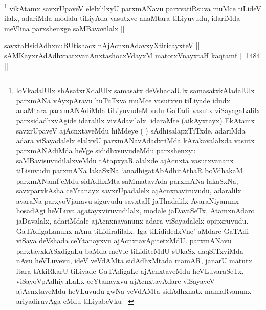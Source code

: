 \begin{artha}
\footnote{loVkadalUlx shAsatxrXdalUlx samasatx deVshadalUlx samasatxkAladalUlx parxmANa vAyxpAravu huTuTxva muMce vasutxvu tiLiyade idudx anaMtara parxmANAdiMda tiLiyuvudeMbudu GaTadi vasutx viSayagaLalilx parxsidadhxvAgide idaralilx vivAdavilalx. idaraMte (aikAyxtayx) EkAtamx savxrUpaveV ajAcnxtaveMdu hiMdeye ( ) sAdhisalapxTiTxde, adariMda adara viSayadalelx elalxvU parxmANavAdadxriMda kArakavalalxda vasutx parxmANAdiMda heVge sididhxsuvudeMdu parxshenxyu saMBavisuvudilalxveMdu tAtapxyaR alalxde ajAcnxta vasutxvananx tiLisuvudu parxmANa lakaSxNa `anadhigatAbAdhitAthaR boVdhakaM parxmANamf'eMdu sidAdhxMta saMmatavAda parxmANa lakaSxNa, savxparxkAsha ceYtanayx savxrUpadalelx ajAcnxnaviruvudu, adaralilx avaraNa parxyoVjanavu siguvudu savxtaH jaThadalilx AvaraNiyanunx hosadAgi heVLuva agatayxviruvudilalx, modale jaDavaSeTx, AtamxnAdaro jaDavalalx, adariMdale ajAcnxnavanunx adara viSayadalelx opipxruvudu. GaTAdigaLanunx nAnu tiLidiralilalx. Iga tiLididedxVne' aMdare GaTAdi viSaya deVshada ceYtanayxvu ajAcnxtavAgitetxMdU. parxmANavu parxtayxkASxdigaLu baMda meVle tiLiditeMdU sUkaSx daqSiTxyiMda nAvu heVLuvevu, ideV veVdAMta sidAdhxMtada mamAR, janarU matutx itara tAkiRkarU tiLiyade GaTAdigaLe ajAcnxtaveMdu heVLuvaraSeTx, viSayoVpAdhiyuLaLx ceYtanayxvu ajAcnxtavAdare viSayaveV ajAcnxtaveMdu heVLuvudu gwNa veVdAMta sidAdhxnatx mamaRvanunx ariyadiruvAga eMdu tiLiyabeVku ||}
vikAtamx savxrUpaveV elelxlilxyU parxmANavu parxvatiRsuva muMce tiLideV ilalx, adariMda modalu tiLiyAda vasutxve anaMtara tiLiyuvudu, idariMda meVlina parxshenxge saMBavavilalx ||
\end{artha}

\begin{shl}
savxtaHsidAdhxnuBUtishacx nAjAcnxnAdavxyXtiricayxteV || \\
sAMKayxrAdAdhxnatxvanAnxtashocxVdayxM matotxV\s nayxtaH kaqtamf ||  1484 ||  
\end{shl}

